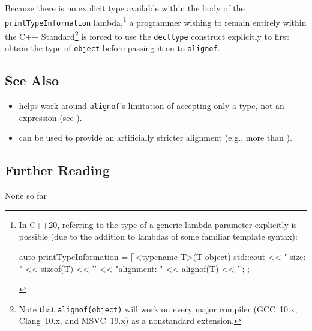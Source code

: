 \noindent Because there is no explicit type available within the body of the
\lstinline!printTypeInformation! lambda,{\cprotect\footnote{In C++20, referring to the type of a generic lambda parameter explicitly is possible (due to the addition to lambdas of some familiar template syntax):

\begin{emcppslisting}[style=footcode]
auto printTypeInformation = []<typename T>(T object)
{
    std::cout << "     size: " << sizeof(T) << '\n'
              << "alignment: " << alignof(T) << '\n';
};
\end{emcppslisting}
      }} a programmer wishing to remain entirely within the C++
Standard{\cprotect\footnote{Note that \lstinline!alignof(object)! will work
on every major compiler (GCC~10.x, Clang~10.x, and MSVC~19.x) as a
  nonstandard extension.}} is forced to use the
\lstinline!decltype! construct explicitly to first obtain
the type of \lstinline!object! before passing it on to \lstinline!alignof!.

\subsection[See Also]{See Also}\label{see-also}

\begin{itemize}
\item{helps work around \lstinline!alignof!'s limitation of accepting only a type, not an expression (see ).}
\item{can be used to provide an artificially stricter alignment (e.g., more than ).}

\end{itemize}

\subsection[Further Reading]{Further Reading}\label{further-reading}

None so far



